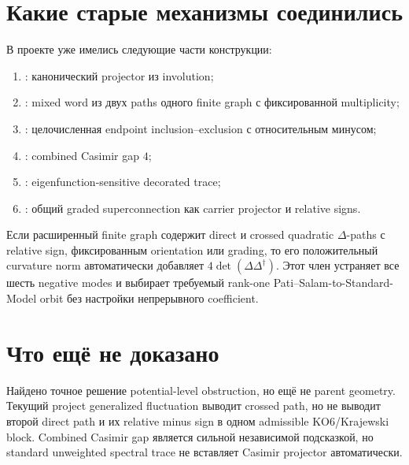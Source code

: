 \section{Какие старые механизмы соединились}

В проекте уже имелись следующие части конструкции:
\begin{enumerate}
 \item {}: канонический projector из
 involution;
 \item {}: mixed word из
 двух paths одного finite graph с фиксированной multiplicity;
 \item {}: целочисленная
 endpoint inclusion--exclusion с относительным минусом;
 \item {}: combined
 Casimir gap \(4\);
 \item {}:
 eigenfunction-sensitive decorated trace;
 \item {}: общий
 graded superconnection как carrier projector и relative signs.
\end{enumerate}

\begin{proposition}
Если расширенный finite graph содержит direct и crossed quadratic
\(\Delta\)-paths с relative sign, фиксированным orientation или grading, то
его положительный curvature norm автоматически добавляет
\(4\det(\Delta\Delta^\dagger)\). Этот член устраняет все шесть negative
modes и выбирает требуемый rank-one Pati--Salam-to-Standard-Model orbit без
настройки непрерывного coefficient.
\end{proposition}

\section{Что ещё не доказано}

Найдено точное решение potential-level obstruction, но ещё не parent
geometry. Текущий project generalized fluctuation выводит crossed path, но
не выводит второй direct path и их relative minus sign в одном admissible
KO6/Krajewski block. Combined Casimir gap является сильной независимой
подсказкой, но standard unweighted spectral trace не вставляет Casimir
projector автоматически.

